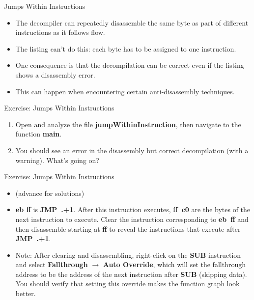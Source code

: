 \documentclass{beamer}
\begin{document}
\begin{frame}
\begin{block}{Jumps Within Instructions}
\begin{itemize}
\item The decompiler can repeatedly disassemble the same byte as part of different instructions as it follows flow.
\item The listing can't do this: each byte has to be assigned to one instruction.
\item One consequence is that the decompilation can be correct even if the listing shows a disassembly error.
\item This can happen when encountering certain anti-disassembly techniques.
\end{itemize}
\end{block}
\end{frame}

\begin{frame}
\begin{block}{Exercise: Jumps Within Instructions}
\begin{enumerate}
\item Open and analyze the file \textbf{jumpWithinInstruction}, then navigate to the function \textbf{main}.
\item You should see an error in the disassembly but correct decompilation (with a warning).  What's going on?
\end{enumerate}
\end{block}
\end{frame}

\begin{frame}
\begin{block}{Exercise: Jumps Within Instructions}
\begin{itemize}
\item[] (advance for solutions)
\pause
\item \textbf{eb ff} is \textbf{JMP~.+1}.  After this instruction executes, \textbf{ff~c0} are the bytes of the next instruction to execute.  Clear the 
instruction corresponding to \textbf{eb~ff} and then disassemble starting at \textbf{ff} to reveal the instructions that execute after \textbf{JMP~.+1}.
\item Note: After clearing and disassembling, right-click on the \textbf{SUB} instruction and select \textbf{Fallthrough} $\rightarrow$ \textbf{Auto Override}, which
will set the fallthrough address to be the address of the next instruction after \textbf{SUB} (skipping data).  You should verify that setting this override makes
the function graph look better.
\end{itemize}
\end{block}
\end{frame}
\end{document}
